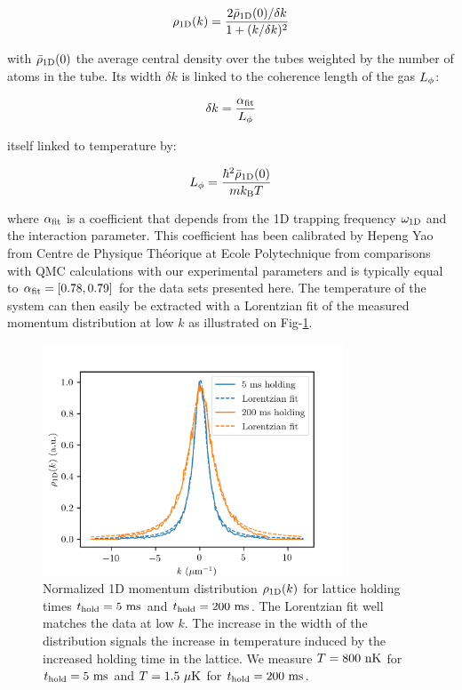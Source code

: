 \begin{equation}
    \rho_{\rm{1D}}(k)=\frac{2 \bar{\rho}_{\rm{1D}}(0)/\delta k }{1+(k/\delta k)^2}
\end{equation}

\noindent with $\bar{\rho}_{\rm{1D}}(0)$ the average central density over the tubes weighted by the number
of atoms in the tube. Its width $\delta k$ is linked to the coherence length of the gas $L_{\rm{\phi}}$:

\begin{equation}
    \delta k= \frac{\alpha_{\rm{fit}}}{L_{\phi}} 
\end{equation}

\noindent itself linked to temperature by:

\begin{equation}
    {L_{\phi}} = \frac{\hbar^2 \bar{\rho}_{\rm{1D}}(0)}{m k_{\mathrm{B}} T}
\end{equation}

\noindent where $\alpha_{\rm{fit}}$ is a coefficient that depends from the 1D trapping frequency $\omega_{\rm{1D}}$ and the interaction parameter. This coefficient has been calibrated by Hepeng Yao from Centre de Physique Théorique at Ecole Polytechnique from comparisons with QMC calculations with our experimental parameters and is typically equal to $\alpha_{\rm{fit}} = [0.78,0.79]$ for the data sets presented here. The temperature of the system can then easily be extracted with a Lorentzian fit of the measured momentum distribution at low $k$ as illustrated on Fig-\ref{fig:1D_temperature}.

\begin{figure}
    \centering
    \includegraphics[width=0.8\textwidth]{Fig/Chapter5/1D_temperature_lorentz.png}
    \caption[Normalized 1D momentum distribution $\rho_{\rm{1D}} (k)$ for lattice holding times $t_{\rm{hold}}=5 \ \rm{ms}$ and $t_{\rm{hold}}=200 \ \rm{ms}$]{Normalized 1D momentum distribution $\rho_{\rm{1D}} (k)$ for lattice holding times $t_{\rm{hold}}=5 \ \rm{ms}$ and $t_{\rm{hold}}=200 \ \rm{ms}$. The Lorentzian fit well matches the data at low $k$. The increase in the width of the distribution signals the increase in temperature induced by the increased holding time in the lattice. We measure $T=800 \ \rm{nK}$ for $t_{\rm{hold}}=5 \ \rm{ms}$ and $T=1.5 \ \mu \rm{K}$ for $t_{\rm{hold}}=200 \ \rm{ms}$.}
    \label{fig:1D_temperature}
\end{figure}

